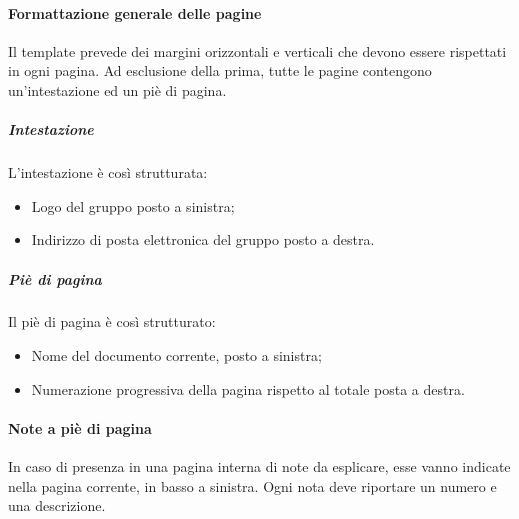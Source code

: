 		\paragraph{Formattazione generale delle pagine} \Spazio
		Il template prevede dei margini orizzontali e verticali che devono essere rispettati in ogni pagina. Ad esclusione della prima, tutte le pagine contengono un’intestazione ed un piè di pagina. 
			
			\subparagraph{Intestazione} \Spazio
			L’intestazione è così strutturata:
			\begin{itemize}
				\item Logo del gruppo posto a sinistra;
				\item Indirizzo di posta elettronica del gruppo posto a destra.
			\end{itemize}
			
			\subparagraph{Piè di pagina} \Spazio
			Il piè di pagina è così strutturato:
			\begin{itemize}
				\item Nome del documento corrente, posto a sinistra;
				\item Numerazione progressiva della pagina rispetto al totale posta a destra.
			\end{itemize}
		
		\paragraph{Note a piè di pagina} \Spazio
		In caso di presenza in una pagina interna di note da esplicare, esse vanno indicate nella pagina corrente, in basso a sinistra. Ogni nota deve riportare un numero e una	descrizione.
		
